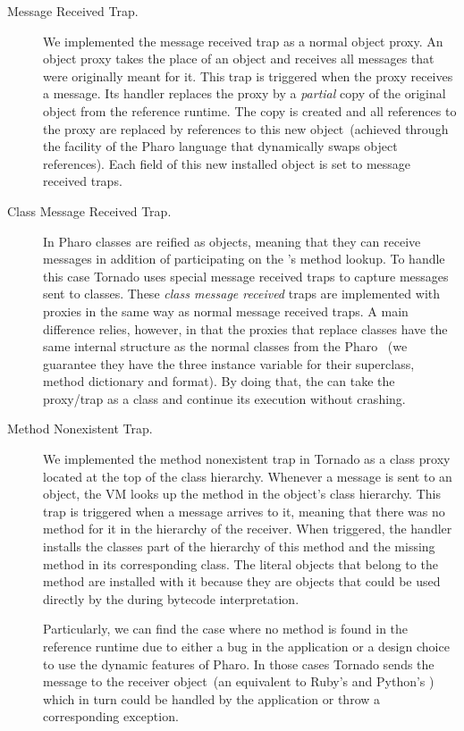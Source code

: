 \begin{description}
\item[Message Received Trap.] We implemented the message received trap as a normal object proxy. An object proxy takes the place of an object and receives all messages that were originally meant for it. This trap is triggered when the proxy receives a message.
Its handler replaces the proxy by a \emph{partial} copy of the original object from the reference runtime.
The copy is created and all references to the proxy are replaced by references to this new object~(achieved through the  facility of the Pharo language that dynamically swaps object references).
Each field of this new installed object is set to message received traps.

\item[Class Message Received Trap.] In Pharo classes are reified as objects, meaning that they can receive messages in addition of participating on the \VM's method lookup. To handle this case Tornado uses special message received traps to capture messages sent to classes. These \emph{class message received} traps are implemented with proxies in the same way as normal message received traps. A main difference relies, however, in that the proxies that replace classes have the same internal structure as the normal classes from the Pharo \VM~(we guarantee they have the three instance variable for their superclass, method dictionary and format). By doing that, the \VM can take the proxy/trap as a class and continue its execution without crashing.

\item[Method Nonexistent Trap.]  We implemented the method nonexistent trap in Tornado as a class proxy located at the top of the class hierarchy. Whenever a message is sent to an object, the VM looks up the method in the object's class hierarchy. This trap is triggered when a message arrives to it, meaning that there was no method for it in the hierarchy of the receiver. When triggered, the handler installs the classes part of the hierarchy of this method and the missing method in its corresponding class. The literal objects that belong to the method are installed with it because they are objects that could be used directly by the \VM during bytecode interpretation.

Particularly, we can find the case where no method is found in the reference runtime due to either a bug in the application or a design choice to use the dynamic features of Pharo. In those cases Tornado sends the  message to the receiver object~(an equivalent to \eg Ruby's  and Python's ) which in turn could be handled by the application or throw a corresponding exception.


\end{description}

